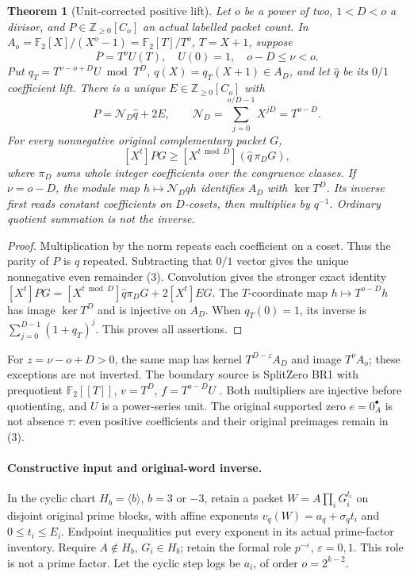 \documentclass[10pt,a4paper]{article}
\newtheorem{theorem}{Theorem}
\begin{document}
\begin{theorem}[Unit-corrected positive lift]\label{lift}
Let $o$ be a power of two, $1<D<o$ a divisor, and
$P\in\mathbb Z_{\ge0}[C_o]$ an actual labelled packet count. In
$A_o=\mathbb F_2[X]/(X^o-1)=\mathbb F_2[T]/T^o$, $T=X+1$, suppose
\[
 \overline P=T^\nu U(T),\quad U(0)=1,\quad o-D\le\nu<o.
\]
Put $q_T=T^{\nu-o+D}U\bmod T^D$, $q(X)=q_T(X+1)\in A_D$, and let
$\widehat q$ be its $0/1$ coefficient lift. There is a unique
$E\in\mathbb Z_{\ge0}[C_o]$ with
\[
 \boxed{P=\mathcal N_D\widehat q+2E,\qquad
 \mathcal N_D=\sum_{j=0}^{o/D-1}X^{jD}=T^{o-D}.}             \tag{3}
\]
For every nonnegative original complementary packet $G$,
\[
 \boxed{[X^t]PG\ge[X^{t\bmod D}](\widehat q\,\pi_DG),}    \tag{4}
\]
where $\pi_D$ sums whole integer coefficients over the congruence classes.
If $\nu=o-D$, the module map $h\mapsto\mathcal N_Dqh$ identifies $A_D$ with
$\ker T^D$. Its inverse first reads constant coefficients on $D$-cosets,
then multiplies by $q^{-1}$. Ordinary quotient summation is not the inverse.
\end{theorem}
\begin{proof}
Multiplication by the norm repeats each coefficient on a coset. Thus the
parity of $P$ is $q$ repeated. Subtracting that $0/1$ vector gives the unique
nonnegative even remainder (3). Convolution gives the stronger exact identity
$[X^t]PG=[X^{t\bmod D}]\widehat q\pi_DG+2[X^t]EG$.
The $T$-coordinate map $h\mapsto T^{o-D}h$ has image $\ker T^D$ and is injective
on $A_D$. When $q_T(0)=1$, its inverse is
$\sum_{j=0}^{D-1}(1+q_T)^j$. This proves all assertions.
\end{proof}
For $z=\nu-o+D>0$, the same map has kernel $T^{D-z}A_D$ and image $T^\nu A_o$;
these exceptions are not inverted. The boundary source is SplitZero BR1 with
prequotient $\mathbb F_2[[T]]$, $v=T^D$, $f=T^{o-D}U$ \cite{SZ}.
Both multipliers are injective before quotienting, and $U$ is a power-series
unit. The original supported zero $e=0_A^\bullet$ is not absence $\tau$:
even positive coefficients and their original preimages remain in (3).

\newpage
\paragraph{Constructive input and original-word inverse.}
In the cyclic chart $H_b=\langle b\rangle$, $b=3$ or $-3$, retain a packet
$W=A\prod_iG_i^{t_i}$ on disjoint original prime blocks, with affine exponents
$v_q(W)=a_q+\sigma_qt_i$ and $0\le t_i\le E_i$. Endpoint inequalities put
every exponent in its actual prime-factor inventory. Require $A\notin H_b$,
$G_i\in H_b$; retain the formal role $p^{-\varepsilon}$, $\varepsilon=0,1$.
This role is not a prime factor. Let the cyclic step logs be $a_i$, of order
$o=2^{k-2}$.
\end{document}
